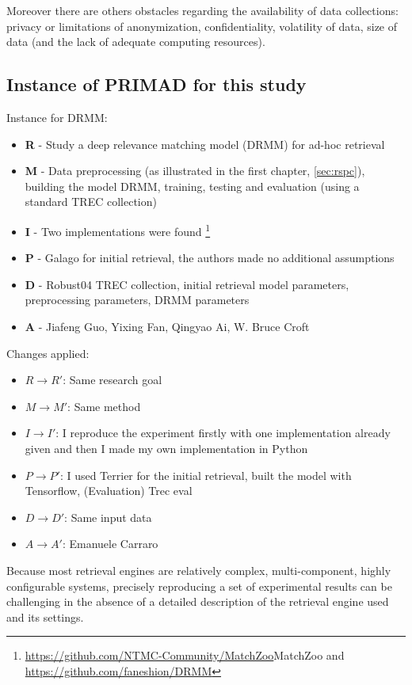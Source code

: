 Moreover there are others obstacles regarding the availability of data collections: privacy or limitations of anonymization, confidentiality, volatility of data, size of data (and the lack of adequate computing resources).

\subsection{Instance of PRIMAD for this study}

Instance for DRMM:

\begin{itemize}
\item \textbf{R} - Study a deep relevance matching model (DRMM) for ad-hoc retrieval
\item \textbf{M} - Data preprocessing (as illustrated in the first chapter, \ref{sec:rspc}), building the model DRMM, training, testing and evaluation (using a standard TREC collection)
\item \textbf{I} - Two implementations were found \footnote{\url{https://github.com/NTMC-Community/MatchZoo}{MatchZoo} \cite{matchzoo} and \url{https://github.com/faneshion/DRMM}}
\item \textbf{P} - Galago for initial retrieval, the authors made no additional assumptions
\item \textbf{D} - Robust04 TREC collection, initial retrieval model parameters, preprocessing parameters, DRMM parameters
\item \textbf{A} - Jiafeng Guo, Yixing Fan, Qingyao Ai, W. Bruce Croft
\end{itemize}

Changes applied:

\begin{itemize}
\item $R \rightarrow R'$: Same research goal
\item $M \rightarrow M'$: Same method
\item $I \rightarrow I'$: I reproduce the experiment firstly with one implementation already given and then I made my own implementation in Python
\item $P \rightarrow P'$: I used Terrier for the initial retrieval, built the model with Tensorflow, (Evaluation) Trec eval
\item $D \rightarrow D'$: Same input data
\item $A \rightarrow A'$: Emanuele Carraro
\end{itemize}

Because most retrieval engines are relatively complex, multi-component, highly configurable systems, precisely reproducing a set of experimental results can be challenging in the absence of a detailed description of the retrieval engine used and its settings.


